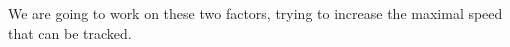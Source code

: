 \documentclass[conference, onecolumn]{IEEEtran}
\begin{document}
We are going to work on these two factors, trying to increase the maximal speed that can be tracked.
	
		
		


\end{document}
